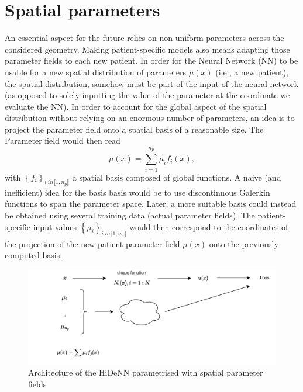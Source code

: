 \section{Spatial parameters}
An essential aspect for the future relies on non-uniform parameters across the considered geometry. Making patient-specific models also means adapting those parameter fields to each new patient. In order for the Neural Network (NN) to be usable for a new spatial distribution of parameters $\mu\left(x\right)$ (i.e., a new patient), the spatial distribution, somehow must be part of the input of the neural network (as opposed to solely inputting the value of the parameter at the coordinate we evaluate the NN).
In order to account for the global aspect of the spatial distribution without relying on an enormous number of parameters, an idea is to project the parameter field onto a spatial basis of a reasonable size. The Parameter field would then read 
\begin{equation}
    \mu\left(x\right) = \sum_{i=1}^{n_p}\mu_i f_i\left(x\right), 
    \label{eq:Projection_parameterField}
\end{equation}
with $\left\{f_i\right\}_{i \ in \llbracket 1,n_p \rrbracket}$ a spatial basis composed of global functions. A naive (and inefficient) idea for the basis basis would be to use discontinuous Galerkin functions to span the parameter space. Later, a more suitable basis could instead be obtained using several training data (actual parameter fields). The patient-specific input values $\left\{\mu_i\right\}_{i \ in \llbracket 1,n_p \rrbracket}$ would then correspond to the coordinates of the projection of the new patient parameter field $\mu(x)$ onto the previously computed basis.


\begin{figure}[h]
    \centering
    \includegraphics[width = 0.8\linewidth]{Figures/Diagram_1.pdf}
    \caption{Architecture of the HiDeNN parametrised with spatial parameter fields}
    \label{SpatialVariability}
\end{figure}


